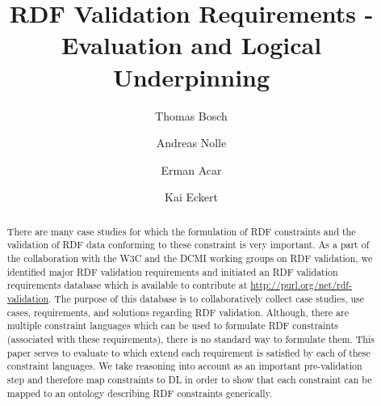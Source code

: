 \documentclass{llncs}
\begin{document}
%
%
\title{RDF Validation Requirements - Evaluation and Logical Underpinning}
\subtitle{}
%
%
\author{Thomas Bosch \and Andreas Nolle \and Erman Acar \and Kai Eckert }
%
%

\maketitle              %

\begin{abstract}
There are many case studies for which the formulation of RDF constraints and the validation of RDF data conforming to these constraint is very important. As a part of the collaboration with the W3C and the DCMI working groups on RDF validation, we identified major RDF validation requirements
and initiated an RDF validation requirements database which is available to contribute at \url{http://purl.org/net/rdf-validation}.
The purpose of this database is to collaboratively collect case studies, use cases, requirements, and solutions regarding RDF validation. Although, there are multiple constraint languages which can be used to formulate RDF constraints (associated with these requirements), 
there is no standard way to formulate them. This paper serves to evaluate to which extend each requirement is satisfied by each of these constraint languages. We take reasoning into account  as an important pre-validation step and therefore map constraints to DL
in order to show that each constraint can be mapped to an ontology describing RDF constraints generically.


\end{abstract}
%
\end{document}
